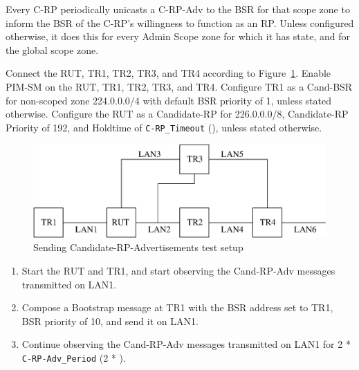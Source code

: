 \documentclass[11pt]{report}
\begin{document}
Every C-RP periodically unicasts a C-RP-Adv to the BSR for that scope zone to
inform the BSR of the C-RP's willingness to function as an RP. Unless
configured otherwise, it does this for every Admin Scope zone for which it has
state, and for the global scope zone.

Connect the RUT, TR1, TR2, TR3, and TR4 according to
Figure~\ref{fig:pim_test_6_3_sending_candidate_rp_advertisements}.
Enable PIM-SM on the RUT, TR1, TR2, TR3, and TR4. Configure TR1
as a Cand-BSR for non-scoped zone 224.0.0.0/4 with default BSR
priority of 1, unless stated otherwise.
Configure the RUT as a Candidate-RP for 226.0.0.0/8, Candidate-RP Priority
of 192, and Holdtime of \verb=C-RP_Timeout= ({\PimsmCRPTimeout}), unless stated
otherwise.


\begin{figure}[htbp]
  \begin{center}
    \includegraphics[scale=0.8]{figs/pim_test_6_3_sending_candidate_rp_advertisements}
    \caption{Sending Candidate-RP-Advertisements test setup}
    \label{fig:pim_test_6_3_sending_candidate_rp_advertisements}
  \end{center}
\end{figure}



\begin{enumerate}

  \item Start the RUT and TR1, and start observing the Cand-RP-Adv messages
  transmitted on LAN1.

  \item Compose a Bootstrap message at TR1 with the BSR address set to TR1,
  BSR priority of 10, and send it on LAN1.

  \item Continue observing the Cand-RP-Adv messages transmitted on LAN1
  for 2 * \verb=C-RP-Adv_Period= (2 * {\PimsmCRPAdvPeriod}).

\end{enumerate}
\end{document}
